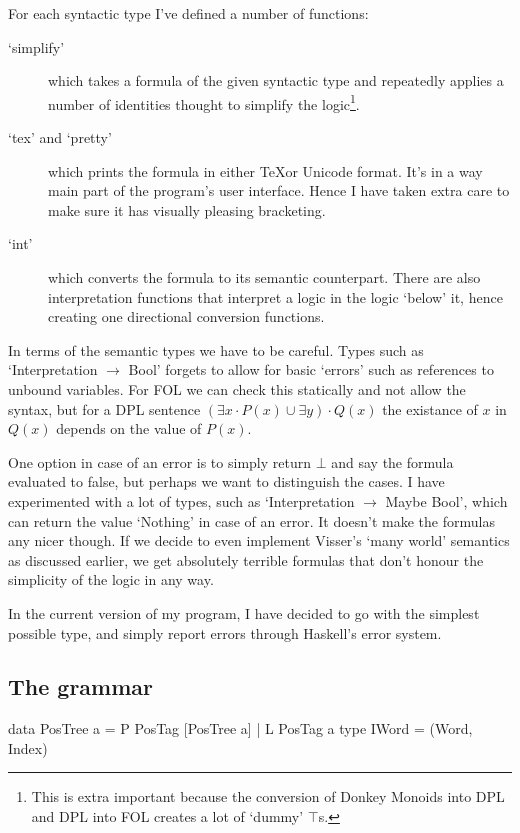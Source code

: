 \documentclass[12pt]{article}
\begin{document}
For each syntactic type I've defined a number of functions:
\begin{description}
\item[`simplify'] which takes a formula of the given syntactic type and repeatedly applies a number of identities thought to simplify the logic\footnote{This is extra important because the conversion of Donkey Monoids into DPL and DPL into FOL creates a lot of `dummy' $\top$s.}.
\item[`tex' and `pretty'] which prints the formula in either \TeX or Unicode format. It's in a way main part of the program's user interface. Hence I have taken extra care to make sure it has visually pleasing bracketing.
\item[`int'] which converts the formula to its semantic counterpart. There are also interpretation functions that interpret a logic in the logic `below' it, hence creating one directional conversion functions.
\end{description}

In terms of the semantic types we have to be careful. Types such as `Interpretation $\rightarrow$ Bool' forgets to allow for basic `errors' such as references to unbound variables. For FOL we can check this statically and not allow the syntax, but for a DPL sentence $(\exists x\cdot P(x) \cup \exists y)\cdot Q(x)$ the existance of $x$ in $Q(x)$ depends on the value of $P(x)$.

One option in case of an error is to simply return $\bot$ and say the formula evaluated to false, but perhaps we want to distinguish the cases. I have experimented with a lot of types, such as `Interpretation $\rightarrow$ Maybe Bool', which can return the value `Nothing' in case of an error. It doesn't make the formulas any nicer though. If we decide to even implement Visser's `many world' semantics as discussed earlier, we get absolutely terrible formulas that don't honour the simplicity of the logic in any way.

In the current version of my program, I have decided to go with the simplest possible type, and simply report errors through Haskell's error system.

\subsection{The grammar}

\newsavebox{\LstBox}
\begin{lrbox}{\LstBox}
\begin{haskell}
data PosTree a = P PosTag [PosTree a] | L PosTag a
type IWord = (Word, Index)
\end{haskell}
\end{lrbox}
\end{document}
